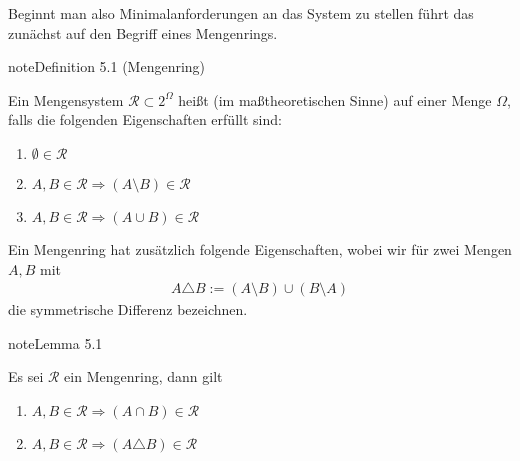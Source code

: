 \documentclass[letterpaper,10pt,german]{jupyterBook}
\begin{document}
\sphinxAtStartPar
Beginnt man also Minimalanforderungen an das System zu stellen führt das zunächst auf den Begriff eines Mengenrings.
\label{masstheorie/masstheorie:def:ring}
\begin{sphinxadmonition}{note}{Definition 5.1 (Mengenring)}



\sphinxAtStartPar
Ein Mengensystem \(\mathcal{R} \subset 2^{\Omega}\) heißt  (im maßtheoretischen Sinne) auf einer Menge \(\Omega\), falls die folgenden Eigenschaften erfüllt sind:
\begin{enumerate}
%
\item {} 
\sphinxAtStartPar
\(\emptyset \in \mathcal{R}\)

\item {} 
\sphinxAtStartPar
\(A,B \in \mathcal{R} \Rightarrow (A \setminus B) \in \mathcal{R}\)

\item {} 
\sphinxAtStartPar
\(A,B \in \mathcal{R} \Rightarrow (A \cup B) \in \mathcal{R}\)

\end{enumerate}
\end{sphinxadmonition}

\sphinxAtStartPar
Ein Mengenring hat zusätzlich folgende Eigenschaften, wobei wir für zwei Mengen \(A,B\) mit
\begin{equation*}
\begin{split}A\triangle B := (A\setminus B)\cup (B\setminus A)\end{split}
\end{equation*}
\sphinxAtStartPar
die symmetrische Differenz bezeichnen.
\label{masstheorie/masstheorie:lemma-1}
\begin{sphinxadmonition}{note}{Lemma 5.1}



\sphinxAtStartPar
Es sei \(\mathcal{R}\) ein Mengenring, dann gilt
\begin{enumerate}
%
\item {} 
\sphinxAtStartPar
\(A,B \in \mathcal{R} \Rightarrow (A \cap B) \in \mathcal{R}\)

\item {} 
\sphinxAtStartPar
\(A,B \in \mathcal{R} \Rightarrow (A \triangle B) \in \mathcal{R}\)

\end{enumerate}
\end{sphinxadmonition}
\end{document}
